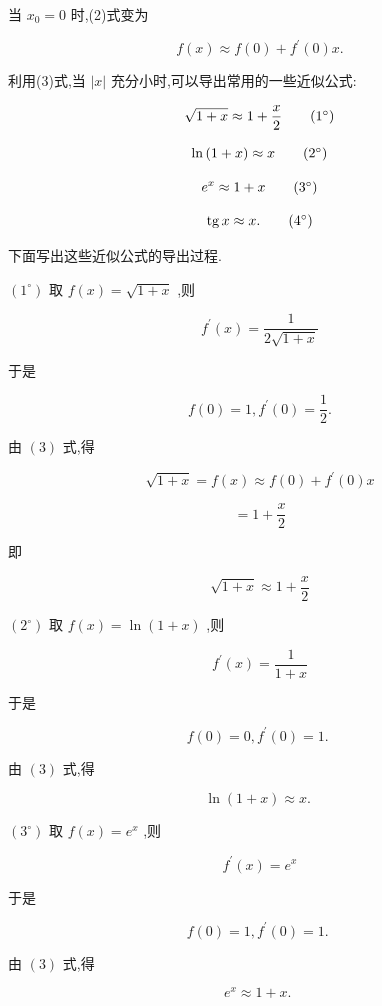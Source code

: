 \documentclass[lang=cn,newtx,12pt,scheme=chinese]{elegantbook}
\begin{document}
当 \({x}_{0} = 0\) 时,(2)式变为

\[
f\left( x\right) \approx f\left( 0\right) + {f}^{\prime }\left( 0\right) x. \tag{3}
\]

利用(3)式,当 \(\left| x\right|\) 充分小时,可以导出常用的一些近似公式:

\[
\sqrt{1 + x} \approx 1 + \frac{x}{2} \tag{${1}^{\circ}$}
\]


\[
\ln \left( {1 + x}\right) \approx x \tag{${2}^{\circ}$}
\]

\[
{e}^{x} \approx 1 + x \tag{${3}^{\circ}$}
\]

\[
\operatorname{tg}x \approx x\text{.} \tag{${4}^{\circ}$}
\]

下面写出这些近似公式的导出过程.

\(\left( {1}^{ \circ }\right)\) 取 \(f\left( x\right) = \sqrt{1 + x}\) ,则

\[
{f}^{\prime }\left( x\right) = \frac{1}{2\sqrt{1 + x}}
\]

于是

\[
f\left( 0\right) = 1,{f}^{\prime }\left( 0\right) = \frac{1}{2}.
\]

由 \(\left( 3\right)\) 式,得

\[
\sqrt{1 + x} = f\left( x\right) \approx f\left( 0\right) + {f}^{\prime }\left( 0\right) x
\]

\[
= 1 + \frac{x}{2}
\]

即

\[
\sqrt{1 + x} \approx 1 + \frac{x}{2}
\]

\(\left( {2}^{ \circ }\right)\) 取 \(f\left( x\right) = \ln \left( {1 + x}\right)\) ,则

\[
{f}^{\prime }\left( x\right) = \frac{1}{1 + x}
\]

于是

\[
f\left( 0\right) = 0,{f}^{\prime }\left( 0\right) = 1\text{. }
\]

由 \(\left( 3\right)\) 式,得

\[
\ln \left( {1 + x}\right) \approx x\text{. }
\]

\(\left( {3}^{ \circ }\right)\) 取 \(f\left( x\right) = {e}^{x}\) ,则

\[
{f}^{\prime }\left( x\right) = {e}^{x}
\]

于是

\[
f\left( 0\right) = 1,{f}^{\prime }\left( 0\right) = 1\text{. }
\]

由 \(\left( 3\right)\) 式,得

\[
{e}^{x} \approx 1 + x\text{. }
\]
\end{document}
